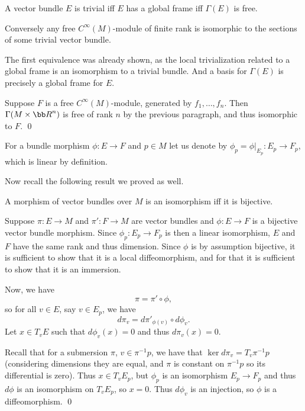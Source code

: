 \bprop

    A vector bundle $E$ is trivial iff $E$ has a global frame iff $\Gamma(E)$ is free.

    Conversely any free $C^\infty(M)$-module of finite rank is isomorphic to the sections of some trivial vector bundle.

\eprop

\bproof

    The first equivalence was already shown, as the local trivialization related to a global frame is an isomorphism to a trivial bundle.
    And a basis for $\Gamma(E)$ is precisely a global frame for $E$.

    Suppose $F$ is a free $C^\infty(M)$-module, generated by $f_1,\dots,f_n$.
    Then $\Gamma(M\times\bR^n)$ is free of rank $n$ by the previous paragraph, and thus isomorphic to $F$.
    \qed

\eproof

For a bundle morphism $\phi\colon E\to F$ and $p\in M$ let us denote by $\phi_p=\phi|_{E_p}\colon E_p\to F_p$, which is linear by definition.

Now recall the following result we proved as well.

\bprop

    A morphism of vector bundles over $M$ is an isomorphism iff it is bijective.

\eprop

\bproof

    Suppose $\pi\colon E\to M$ and $\pi'\colon F\to M$ are vector bundles and $\phi\colon E\to F$ is a bijective vector bundle morphism.
    Since $\phi_p\colon E_p\to F_p$ is then a linear isomorphism, $E$ and $F$ have the same rank and thus dimension.
    Since $\phi$ is by assumption bijective, it is sufficient to show that it is a local diffeomorphism, and for that it is sufficient to show that it is
    an immersion.

    Now, we have
    $$ \pi = \pi'\circ\phi, $$
    so for all $v\in E$, say $v\in E_p$, we have
    $$ d\pi_v = d\pi'_{\phi(v)}\circ d\phi_v . $$
    Let $x\in T_vE$ such that $d\phi_v(x)=0$ and thus $d\pi_v(x)=0$.

    Recall that for a submersion $\pi$, $v\in\pi^{-1}p$, we have that $\ker d\pi_v=T_v\pi^{-1}p$ (considering dimensions they are equal, and $\pi$ is constant
    on $\pi^{-1}p$ so its differential is zero).
    Thus $x\in T_vE_p$, but $\phi_p$ is an isomorphism $E_p\to F_p$ and thus $d\phi$ is an isomorphism on $T_vE_p$, so $x=0$.
    Thus $d\phi_v$ is an injection, so $\phi$ is a diffeomorphism.
    \qed

